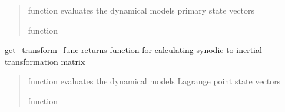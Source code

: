 \documentclass[letterpaper,10pt,english]{sphinxmanual}
\begin{document}
\begin{fulllineitems}
\begin{fulllineitems}
\begin{quote}
\begin{description}
\sphinxAtStartPar
{} \sphinxhyphen{}\sphinxhyphen{} function evaluates the dynamical model\textquotesingle{}s primary state vectors

\sphinxAtStartPar
function

\end{description}\end{quote}

\end{fulllineitems}


\begin{fulllineitems}
\label{\detokenize{models:pyraa.models.Models.get_transform_func}}
\pysigstartsignatures
{}
\pysigstopsignatures
\sphinxAtStartPar
get\_transform\_func \sphinxhyphen{} returns function for calculating
synodic to inertial transformation matrix
\begin{quote}\begin{description}
\sphinxAtStartPar
{} \sphinxhyphen{}\sphinxhyphen{} 

\sphinxAtStartPar
{} \sphinxhyphen{}\sphinxhyphen{} function evaluates the dynamical model\textquotesingle{}s Lagrange point state vectors

\sphinxAtStartPar
function

\end{description}\end{quote}

\end{fulllineitems}


\end{fulllineitems}

\end{document}
